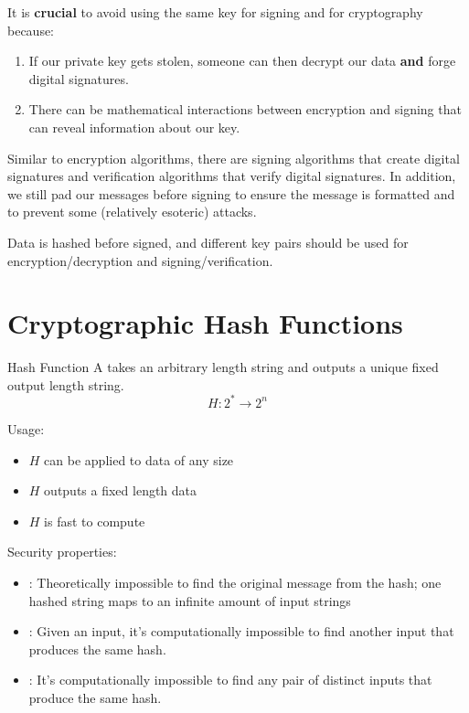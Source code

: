 \documentclass[code]{amznotes}
\begin{document}
It is \textbf{crucial} to avoid using the same key for signing and for cryptography because:
\begin{enumerate}[noitemsep]
    \item If our private key gets stolen, someone can then decrypt our data \textbf{and} forge digital signatures.
    \item There can be mathematical interactions between encryption and signing that can reveal information about our key.
\end{enumerate}


Similar to encryption algorithms, there are signing algorithms that create digital signatures and verification algorithms that verify digital signatures. In addition, we still pad our messages before signing to ensure the message is formatted and to prevent some (relatively esoteric) attacks.

Data is hashed before signed, and different key pairs should be used for encryption/decryption and signing/verification.

\section{Cryptographic Hash Functions}

\begin{dfnbox}{Hash Function}{}
    A  takes an arbitrary length string and outputs a unique fixed output length string.
    \tcblower
    \[ H : 2^* \to 2^n \]
\end{dfnbox}

Usage:
\begin{itemize}[noitemsep]
    \item $H$ can be applied to data of any size
    \item $H$ outputs a fixed length data
    \item $H$ is fast to compute
\end{itemize}

Security properties:
\begin{itemize}[noitemsep]
    \item {}: Theoretically impossible to find the original message from the hash; one hashed string maps to an infinite amount of input strings
    \item {}: Given an input, it's computationally impossible to find another input that produces the same hash.
    \item {}: It's computationally impossible to find any pair of distinct inputs that produce the same hash.
\end{itemize}
\end{document}
